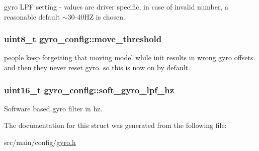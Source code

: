 gyro L\+P\+F setting -\/ values are driver specific, in case of invalid number, a reasonable default $\sim$30-\/40\+H\+Z is chosen. 

\hypertarget{structgyro__config_aa4ff0a56b9956a8f1581ffb4d7b7d123}{
\subsubsection[{move\+\_\+threshold}]{\setlength{\rightskip}{0pt plus 5cm}uint8\+\_\+t gyro\+\_\+config\+::move\+\_\+threshold}}\label{structgyro__config_aa4ff0a56b9956a8f1581ffb4d7b7d123}


people keep forgetting that moving model while init results in wrong gyro offsets. and then they never reset gyro. so this is now on by default. 

\hypertarget{structgyro__config_af96fd78759f2fca1a0a20b7a71c8da11}{
\subsubsection[{soft\+\_\+gyro\+\_\+lpf\+\_\+hz}]{\setlength{\rightskip}{0pt plus 5cm}uint16\+\_\+t gyro\+\_\+config\+::soft\+\_\+gyro\+\_\+lpf\+\_\+hz}}\label{structgyro__config_af96fd78759f2fca1a0a20b7a71c8da11}


Software based gyro filter in hz. 



The documentation for this struct was generated from the following file\+:\begin{DoxyCompactItemize}
\item 
src/main/config/\hyperlink{config_2gyro_8h}{gyro.\+h}\end{DoxyCompactItemize}

